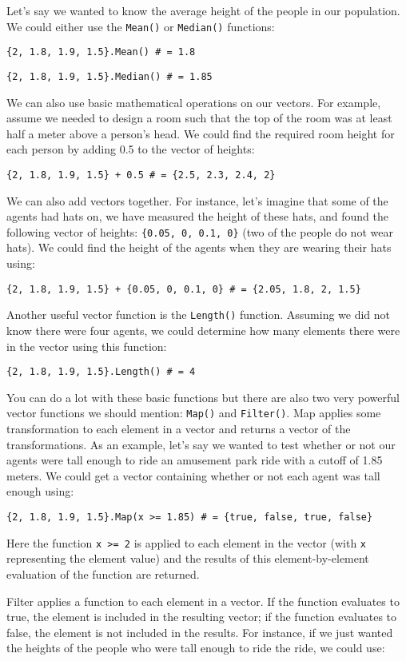 \documentclass[]{memoir}
\begin{document}
Let's say we wanted to know the average height of the people in our
population. We could either use the \lstinline!Mean()! or
\lstinline!Median()! functions:

\lstinline!{2, 1.8, 1.9, 1.5}.Mean() # = 1.8!

\lstinline!{2, 1.8, 1.9, 1.5}.Median() # = 1.85!

We can also use basic mathematical operations on our vectors. For
example, assume we needed to design a room such that the top of the room
was at least half a meter above a person's head. We could find the
required room height for each person by adding 0.5 to the vector of
heights:

\lstinline!{2, 1.8, 1.9, 1.5} + 0.5 # = {2.5, 2.3, 2.4, 2}!

We can also add vectors together. For instance, let's imagine that some
of the agents had hats on, we have measured the height of these hats,
and found the following vector of heights: \lstinline!{0.05, 0, 0.1, 0}!
(two of the people do not wear hats). We could find the height of the
agents when they are wearing their hats using:

\lstinline!{2, 1.8, 1.9, 1.5} + {0.05, 0, 0.1, 0} # = {2.05, 1.8, 2, 1.5}!

Another useful vector function is the \lstinline!Length()! function.
Assuming we did not know there were four agents, we could determine how
many elements there were in the vector using this function:

\lstinline!{2, 1.8, 1.9, 1.5}.Length() # = 4!

You can do a lot with these basic functions but there are also two very
powerful vector functions we should mention: \lstinline!Map()! and
\lstinline!Filter()!. Map applies some transformation to each element in
a vector and returns a vector of the transformations. As an example,
let's say we wanted to test whether or not our agents were tall enough
to ride an amusement park ride with a cutoff of 1.85 meters. We could
get a vector containing whether or not each agent was tall enough using:

\lstinline!{2, 1.8, 1.9, 1.5}.Map(x >= 1.85) # = {true, false, true, false}!

Here the function \lstinline!x >= 2! is applied to each element in the
vector (with \lstinline!x! representing the element value) and the
results of this element-by-element evaluation of the function are
returned.

Filter applies a function to each element in a vector. If the function
evaluates to true, the element is included in the resulting vector; if
the function evaluates to false, the element is not included in the
results. For instance, if we just wanted the heights of the people who
were tall enough to ride the ride, we could use:
\end{document}

